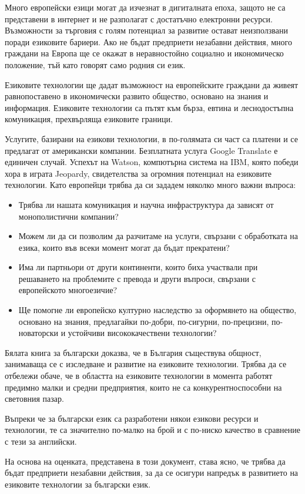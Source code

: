 \documentclass[]{../../metanetpaper}
\begin{document}
\begin{multicols}{2}
Много европейски езици могат да изчезнат в дигиталната епоха, защото не са представени в интернет и не разполагат с достатъчно електронни ресурси. Възможности за търговия с голям потенциал за развитие остават неизползвани поради езиковите бариери. Ако не бъдат предприети незабавни действия, много граждани на Европа ще се окажат в неравностойно социално и икономическо положение, тъй като говорят само родния си език. 
 
Езиковите технологии ще дадат възможност на европейските граждани да живеят равнопоставено в икономически развито  общество, основано на знания и информация. Езиковите технологии са пътят към бърза, евтина и леснодостъпна комуникация, прехвърляща езиковите граници. 

Услугите, базирани на езикови технологии,  в по-голямата си част са платени и се предлагат от американски компании. Безплатната услуга Google Translate е единичен случай. Успехът на Watson, компютърна система на IBM, която победи хора в играта  Jeopardy, свидетелства за огромния потенциал на езиковите технологии. Като европейци трябва да си зададем няколко много важни въпроса:

\begin{itemize}
\item Трябва ли нашата комуникация и научна инфраструктура да зависят от монополистични компании?
\item Можем ли да си позволим да разчитаме на услуги, свързани с обработката на езика, които във всеки момент могат да бъдат прекратени? 
\item Има ли партньори от други континенти, които биха участвали при решаването на проблемите с превода и други въпроси, свързани с европейското многоезичие?
\item Ще помогне ли европейско културно наследство за оформянето на общество, основано на знания,  предлагайки по-добри, по-сигурни, по-прецизни, по-новаторски и устойчиви висококачествени технологии?
\end{itemize}

Бялата книга за български доказва, че в България съществува общност, занимаваща се с изследване и развитие на езиковите технологии. Трябва да се отбележи обаче, че в областта на езиковите технологии в момента работят предимно малки и средни предприятия, които не са конкурентноспособни на световния пазар.

Въпреки че за български език са разработени някои езикови ресурси и технологии, те са значително по-малко на брой и с по-ниско качество в сравнение с тези за английски.

На основа на оценката, представена в този документ, става ясно, че трябва да бъдат предприети незабавни действия, за да се осигури напредък в развитието на езиковите технологии за български език.
\end{multicols}
\end{document}
